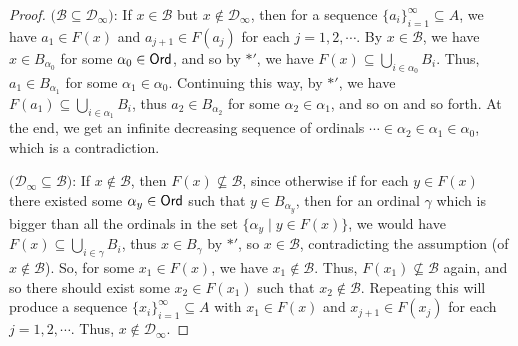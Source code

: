 \documentclass[12pt]{article}
\begin{document}
\begin{proof}

\noindent
$\boldsymbol( \mathcal{B} \subseteq \mathcal{D}_\infty \boldsymbol)$: If $x\in\mathcal{B}$ but $x\not\in\mathcal{D}_\infty$, then for a sequence $\{a_i\}_{i=1}^{\infty}\subseteq A$, we have $a_1\in F(x)$ and $a_{j+1}\in F(a_j)$ for each $j=1,2,\cdots$. By $x\in\mathcal{B}$, we have $x\in B_{\alpha_0}$ for some $\alpha_0\in{\sf Ord}$, and so by $\boldsymbol\ast'$, we have $F(x)\subseteq\bigcup_{i\in\alpha_0}B_i$. Thus, $a_1\in B_{\alpha_1}$ for some $\alpha_1\in\alpha_0$. Continuing this way, by $\boldsymbol\ast'$, we have
$F(a_1)\subseteq\bigcup_{i\in\alpha_1}B_i$,
thus $a_2\in B_{\alpha_2}$ for some $\alpha_2\in\alpha_1$, and so on and so forth. At the end, we get an infinite decreasing sequence of ordinals $\cdots\in\alpha_2\in\alpha_1\in\alpha_0$, which is a contradiction.

\noindent
$\boldsymbol( \mathcal{D}_\infty \subseteq \mathcal{B} \boldsymbol)$: If $x\not\in\mathcal{B}$, then $F(x)\not\subseteq\mathcal{B}$, since otherwise if for each $y\in F(x)$ there existed some $\alpha_y\in{\sf Ord}$ such that $y\in B_{\alpha_y}$, then for an ordinal $\gamma$ which is bigger than all the ordinals in the set $\{\alpha_y\mid y\in F(x)\}$, we would have $F(x)\subseteq\bigcup_{i\in\gamma}B_i$, thus $x\in B_\gamma$ by $\boldsymbol\ast'$, so $x\in\mathcal{B}$, contradicting the assumption (of $x\not\in\mathcal{B}$). So, for some $x_1\in F(x)$, we have $x_1\not\in\mathcal{B}$. Thus, $F(x_1)\not\subseteq\mathcal{B}$ again, and so there should exist some $x_2\in F(x_1)$ such that $x_2\not\in\mathcal{B}$. Repeating this will produce a sequence $\{x_i\}_{i=1}^\infty\subseteq A$ with $x_1\in F(x)$ and $x_{j+1}\in F(x_j)$ for each $j=1,2,\cdots$. Thus, $x\not\in\mathcal{D}_\infty$.
\end{proof}
\end{document}

